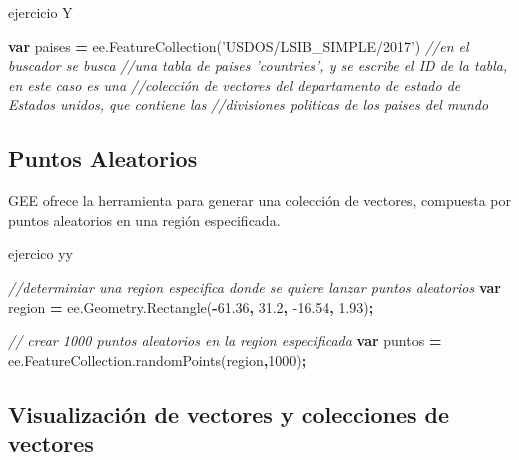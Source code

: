 \documentclass[
]{article}
\newenvironment{Shaded}{\begin{snugshade}}{\end{snugshade}}
\newcommand{\AttributeTok}[1]{\textcolor[rgb]{0.77,0.63,0.00}{#1}}
\newcommand{\CommentTok}[1]{\textcolor[rgb]{0.56,0.35,0.01}{\textit{#1}}}
\newcommand{\DecValTok}[1]{\textcolor[rgb]{0.00,0.00,0.81}{#1}}
\newcommand{\FloatTok}[1]{\textcolor[rgb]{0.00,0.00,0.81}{#1}}
\newcommand{\KeywordTok}[1]{\textcolor[rgb]{0.13,0.29,0.53}{\textbf{#1}}}
\newcommand{\NormalTok}[1]{#1}
\newcommand{\OperatorTok}[1]{\textcolor[rgb]{0.81,0.36,0.00}{\textbf{#1}}}
\newcommand{\StringTok}[1]{\textcolor[rgb]{0.31,0.60,0.02}{#1}}
\newcommand{\VariableTok}[1]{\textcolor[rgb]{0.00,0.00,0.00}{#1}}
\begin{document}
ejercicio Y

\begin{Shaded}
\begin{Highlighting}[]
\KeywordTok{var}\NormalTok{ paises }\OperatorTok{=} \VariableTok{ee}\NormalTok{.}\AttributeTok{FeatureCollection}\NormalTok{(}\StringTok{'USDOS/LSIB_SIMPLE/2017'}\NormalTok{) }\CommentTok{//en el buscador se busca }
\CommentTok{//una tabla de paises 'countries', y se escribe el ID de la tabla, en este caso es una }
\CommentTok{//colección de vectores del departamento de estado de Estados unidos, que contiene las }
\CommentTok{//divisiones politicas de los paises del mundo  }
\end{Highlighting}
\end{Shaded}

\hypertarget{puntos-aleatorios}{%
\subsection{Puntos Aleatorios}\label{puntos-aleatorios}}

GEE ofrece la herramienta para generar una colección de vectores,
compuesta por puntos aleatorios en una región especificada.

ejercico yy

\begin{Shaded}
\begin{Highlighting}[]
\CommentTok{//determiniar una region especifica donde se quiere lanzar puntos aleatorios}
\KeywordTok{var}\NormalTok{ region }\OperatorTok{=} \VariableTok{ee}\NormalTok{.}\VariableTok{Geometry}\NormalTok{.}\AttributeTok{Rectangle}\NormalTok{(}\OperatorTok{-}\FloatTok{61.36}\OperatorTok{,} \FloatTok{31.2}\OperatorTok{,} \FloatTok{-16.54}\OperatorTok{,} \FloatTok{1.93}\NormalTok{)}\OperatorTok{;}

\CommentTok{// crear 1000 puntos aleatorios en la region especificada}
\KeywordTok{var}\NormalTok{ puntos }\OperatorTok{=} \VariableTok{ee}\NormalTok{.}\VariableTok{FeatureCollection}\NormalTok{.}\AttributeTok{randomPoints}\NormalTok{(region}\OperatorTok{,}\DecValTok{1000}\NormalTok{)}\OperatorTok{;}
\end{Highlighting}
\end{Shaded}

\hypertarget{visualizaciuxf3n-de-vectores-y-colecciones-de-vectores}{%
\subsection{Visualización de vectores y colecciones de
vectores}\label{visualizaciuxf3n-de-vectores-y-colecciones-de-vectores}}
\end{document}
